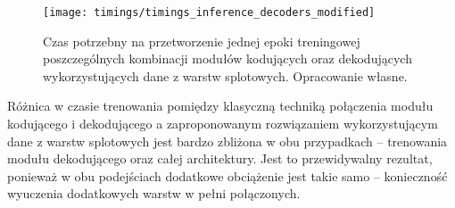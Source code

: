 \begin{figure}[H]
    \centering
    \texttt{[image: timings/timings\_inference\_decoders\_modified]}
    \caption{Czas potrzebny na przetworzenie jednej epoki treningowej poszczególnych kombinacji modułów kodujących oraz dekodujących wykorzystujących dane z warstw splotowych. Opracowanie własne.}
    \label{fig:timings-networks-modified}
\end{figure}
\noindent Różnica w czasie trenowania pomiędzy klasyczną techniką połączenia modułu kodującego i dekodującego a zaproponowanym rozwiązaniem wykorzystującym dane z warstw splotowych jest bardzo zbliżona w obu przypadkach -- trenowania modułu dekodującego oraz całej architektury. Jest to przewidywalny rezultat, ponieważ w obu podejściach dodatkowe obciążenie jest takie samo -- konieczność wyuczenia dodatkowych warstw w pełni połączonych.
